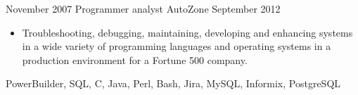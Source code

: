 \begin{experiences}
    \emptySeparator

    \experience
        {November 2007}
        {Programmer analyst}
        {AutoZone}
        {September 2012}
        {
            \begin{itemize}
                \item Troubleshooting, debugging, maintaining, developing and 
                    enhancing systems in a wide variety of programming 
                    languages and operating systems in a production environment 
                    for a Fortune 500 company.
            \end{itemize}
        }
        {
            PowerBuilder, 
            SQL, 
            C, 
            Java, 
            Perl, 
            Bash, 
            Jira, 
            MySQL, 
            Informix, 
            PostgreSQL
        }

\end{experiences}
